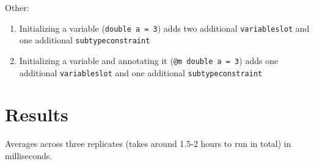 \documentclass[10pt]{article}
\let\oldsection\section
\renewcommand\section{\clearpage\oldsection}
\begin{document}
Other:
\begin{enumerate}
    \item Initializing a variable (\texttt{double a = 3}) adds two additional \texttt{variableslot} and one additional \texttt{subtypeconstraint}
    \item Initializing a variable and annotating it (\texttt{@m double a = 3}) adds one additional \texttt{variableslot} and one additional \texttt{subtypeconstraint}
\end{enumerate}
\fi

\section{Results}

Averages across three replicates (takes around 1.5-2 hours to run in total) in milliseconds.
\end{document}
